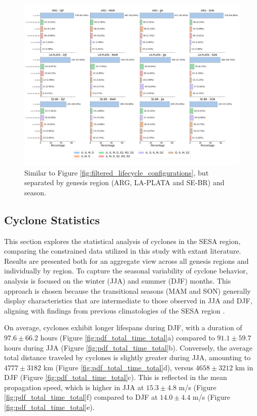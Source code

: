 \begin{figure}[h!]
\centering
\includegraphics[width=\textwidth]{figs_4/multi_panel_barplots_filtered.png}
\caption[Life cycle configurations by regions and season]{Similar to Figure \ref{fig:filtered_lifecycle_configurations}, but separated by genesis region (ARG, LA-PLATA and SE-BR) and season.}
\label{fig:lifecycle_configurations_seasonal_variability}
\end{figure}


\subsection{Cyclone Statistics}
\label{sec:cyclone_statistics}

This section explores the statistical analysis of cyclones in the SESA region, comparing the constrained data utilized in this study with extant literature. Results are presented both for an aggregate view across all genesis regions and individually by region. To capture the seasonal variability of cyclone behavior, analysis is focused on the winter (JJA) and summer (DJF) months. This approach is chosen because the transitional seasons (MAM and SON) generally display characteristics that are intermediate to those observed in JJA and DJF, aligning with findings from previous climatologies of the SESA region \citep[e.g.]{gan1991surface, reboita2010south, crespo2021potential}. 

On average, cyclones exhibit longer lifespans during DJF, with a duration of $97.6 \pm 66.2$ hours (Figure \ref{fig:pdf_total_time_total}a) compared to $91.1 \pm 59.7$ hours during JJA (Figure \ref{fig:pdf_total_time_total}b). Conversely, the average total distance traveled by cyclones is slightly greater during JJA, amounting to $4777 \pm 3182$ km (Figure \ref{fig:pdf_total_time_total}d), versus $4658 \pm 3212$ km in DJF (Figure \ref{fig:pdf_total_time_total}c). This is reflected in the mean propagation speed, which is higher in JJA at $15.3 \pm 4.8$ m/s (Figure \ref{fig:pdf_total_time_total}f) compared to DJF at $14.0 \pm 4.4$ m/s (Figure \ref{fig:pdf_total_time_total}e).

